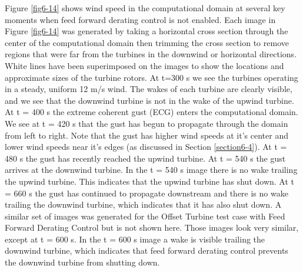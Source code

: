 Figure \ref{fig6-14} shows wind speed in the computational domain at several key moments when feed forward derating control is not enabled. Each image in Figure \ref{fig6-14} was generated by taking a horizontal cross section through the center of the computational domain then trimming the cross section to remove regions that were far from the turbines in the downwind or horizontal directions. White lines have been superimposed on the images to show the locations and approximate sizes of the turbine rotors. At t=300 s we see the turbines operating in a steady, uniform 12 m/s wind. The wakes of each turbine are clearly visible, and we see that the downwind turbine is not in the wake of the upwind turbine. At t = 400 s the extreme coherent gust (ECG) enters the computational domain. We see at t = 420 s that the gust has begun to propagate through the domain from left to right. Note that the gust has higher wind speeds at it's center and lower wind speeds near it's edges (as discussed in Section \ref{section6-4}). At t = 480 s the gust has recently reached the upwind turbine. At t = 540 s the gust arrives at the downwind turbine. In the t = 540 s image there is no wake trailing the upwind turbine. This indicates that the upwind turbine has shut down. At t = 660 s the gust has continued to propagate downstream and there is no wake trailing the downwind turbine, which indicates that it has also shut down. A similar set of images was generated for the Offset Turbine test case with Feed Forward Derating Control but is not shown here. Those images look very similar, except at t = 600 s. In the t = 600 s image a wake is visible trailing the downwind turbine, which indicates that feed forward derating control prevents the downwind turbine from shutting down.

